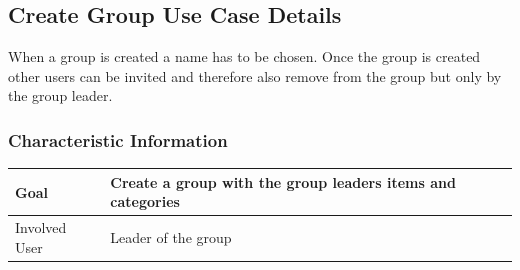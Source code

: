 \documentclass[12pt]{article}
\theoremstyle{definition}
\begin{document}
\subsection{Create Group Use Case Details}

When a group is created a name has to be chosen. Once the group is created other users can be invited and therefore also remove from the group but only by the group leader.

\subsubsection{Characteristic Information}

\begin{tabular}{|l|l|}
\hline
Goal &  Create a group with the group leaders items and categories\\ \hline
Involved User & Leader of the group \\ \hline
\end{tabular}
\end{document}

